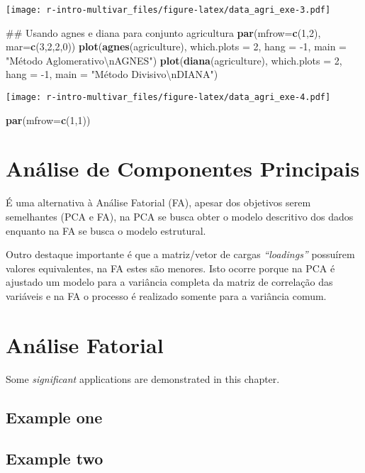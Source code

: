 \documentclass[]{book}
\newenvironment{Shaded}{\begin{snugshade}}{\end{snugshade}}
\newcommand{\KeywordTok}[1]{\textcolor[rgb]{0.13,0.29,0.53}{\textbf{{#1}}}}
\newcommand{\DataTypeTok}[1]{\textcolor[rgb]{0.13,0.29,0.53}{{#1}}}
\newcommand{\DecValTok}[1]{\textcolor[rgb]{0.00,0.00,0.81}{{#1}}}
\newcommand{\CharTok}[1]{\textcolor[rgb]{0.31,0.60,0.02}{{#1}}}
\newcommand{\StringTok}[1]{\textcolor[rgb]{0.31,0.60,0.02}{{#1}}}
\newcommand{\NormalTok}[1]{{#1}}
\begin{document}
\texttt{[image: r-intro-multivar\_files/figure-latex/data\_agri\_exe-3.pdf]}

\begin{Shaded}
\begin{Highlighting}[]
\NormalTok{## Usando agnes e diana para conjunto agricultura}
\KeywordTok{par}\NormalTok{(}\DataTypeTok{mfrow=}\KeywordTok{c}\NormalTok{(}\DecValTok{1}\NormalTok{,}\DecValTok{2}\NormalTok{), }\DataTypeTok{mar=}\KeywordTok{c}\NormalTok{(}\DecValTok{3}\NormalTok{,}\DecValTok{2}\NormalTok{,}\DecValTok{2}\NormalTok{,}\DecValTok{0}\NormalTok{))}
\KeywordTok{plot}\NormalTok{(}\KeywordTok{agnes}\NormalTok{(agriculture), }\DataTypeTok{which.plots =} \DecValTok{2}\NormalTok{, }\DataTypeTok{hang =} \NormalTok{-}\DecValTok{1}\NormalTok{,}
     \DataTypeTok{main =} \StringTok{"Método Aglomerativo}\CharTok{\textbackslash{}n}\StringTok{AGNES"}\NormalTok{)}
\KeywordTok{plot}\NormalTok{(}\KeywordTok{diana}\NormalTok{(agriculture), }\DataTypeTok{which.plots =} \DecValTok{2}\NormalTok{, }\DataTypeTok{hang =} \NormalTok{-}\DecValTok{1}\NormalTok{,}
     \DataTypeTok{main =} \StringTok{"Método Divisivo}\CharTok{\textbackslash{}n}\StringTok{DIANA"}\NormalTok{)}
\end{Highlighting}
\end{Shaded}

\texttt{[image: r-intro-multivar\_files/figure-latex/data\_agri\_exe-4.pdf]}

\begin{Shaded}
\begin{Highlighting}[]
\KeywordTok{par}\NormalTok{(}\DataTypeTok{mfrow=}\KeywordTok{c}\NormalTok{(}\DecValTok{1}\NormalTok{,}\DecValTok{1}\NormalTok{))}
\end{Highlighting}
\end{Shaded}

\chapter{Análise de Componentes Principais}\label{PCA}

É uma alternativa à Análise Fatorial (FA), apesar dos objetivos serem
semelhantes (PCA e FA), na PCA se busca obter o modelo descritivo dos
dados enquanto na FA se busca o modelo estrutural.

Outro destaque importante é que a matriz/vetor de cargas
\emph{``loadings''} possuírem valores equivalentes, na FA estes são
menores. Isto ocorre porque na PCA é ajustado um modelo para a variância
completa da matriz de correlação das variáveis e na FA o processo é
realizado somente para a variância comum.

\chapter{Análise Fatorial}\label{FA}

Some \emph{significant} applications are demonstrated in this chapter.

\section{Example one}\label{example-one}

\section{Example two}\label{example-two}


\end{document}
